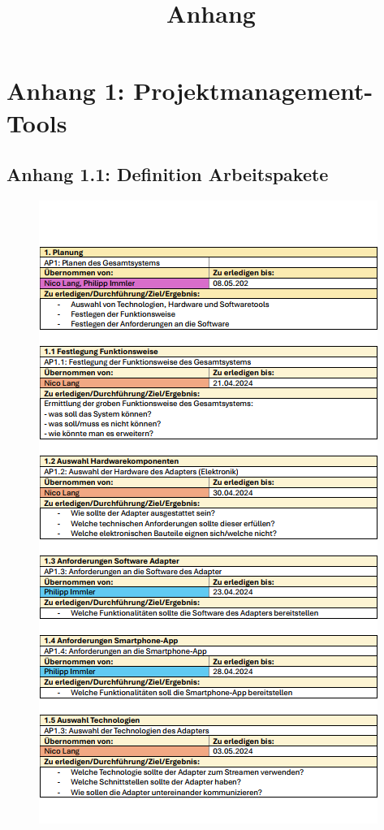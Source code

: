 \documentclass[11pt, twoside]{article}
\title{Anhang}
\author{}
\begin{document}
\renewcommand{\contentsname}{Anhangsverzeichnis}
\tableofcontents
\newpage

\section{Anhang 1: Projektmanagement-Tools}
\subsection{Anhang 1.1: Definition Arbeitspakete}
\begin{figure}[H]  
    \centering
    \includegraphics[height=\textheight]{ap_1.png}
\end{figure}
\end{document}
